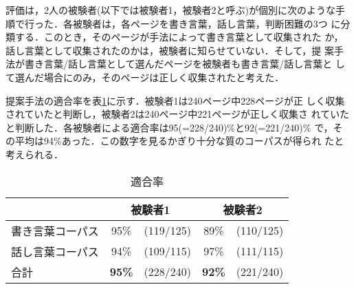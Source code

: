 \documentclass{nlp}
\begin{document}
評価は，2人の被験者(以下では被験者1，被験者2と呼ぶ)が個別に次のような手
順で行った．各被験者は，各ページを書き言葉，話し言葉，判断困難の3つ
に分類する．このとき，そのページが手法によって書き言葉として収集された
か，話し言葉として収集されたのかは，被験者に知らせていない．そして，提
案手法が書き言葉/話し言葉として選んだページを被験者も書き言葉/話し言葉と
して選んだ場合にのみ，そのページは正しく収集されたと考えた．

提案手法の適合率を表\ref{eval1}に示す．被験者1は240ページ中228ページが正
しく収集されていたと判断し，被験者2は240ページ中221ページが正しく収集さ
れていたと判断した．各被験者による適合率は95(=228/240)\%と92(=221/240)\%
で，その平均は94\%あった．この数字を見るかぎり十分な質のコーパスが得られ
たと考えられる．
\begin{table}[h]
 \begin{center}
  \caption{適合率}
  \label{eval1}
    \begin{tabular}{lc@{}cc@{}c}\hline
                      & \multicolumn{2}{c}{被験者1} & \multicolumn{2}{c}{被験者2} \\ \hline
   書き言葉コーパス   & 95\% & (119/125) & 89\% & (110/125) \\
   話し言葉コーパス   & 94\% & (109/115) & 97\% & (111/115) \\ \hline
   合計               & {\bf 95\%} & (228/240) & {\bf 92\%} & (221/240) \\ \hline
  \end{tabular}
 \end{center}
\end{table}
\end{document}
